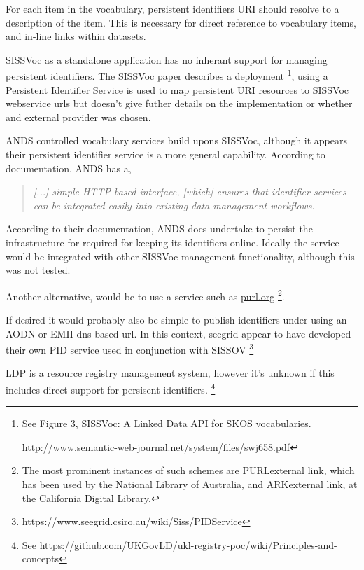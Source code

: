 \documentclass[10pt,a4paper]{article}
\newenvironment{italicquotes}
{\begin{quote}\itshape}
{\end{quote}}
\begin{document}
\begin{flushleft}
  For each item in the vocabulary, persistent identifiers {URI} should
  resolve to a description of the item.  This is necessary for direct reference to
  vocabulary items, and in-line links within datasets.

  \item[SISSVoc] as a standalone application has no inherant support for managing persistent
  identifiers. The SISSVoc paper describes a deployment \footnote{ See Figure 3,
  SISSVoc: A Linked Data API for SKOS vocabularies.

  \url{http://www.semantic-web-journal.net/system/files/swj658.pdf} }, using a
  Persistent Identifier Service is used to map persistent URI resources to SISSVoc
  webservice urls but doesn't give futher details on the implementation or
  whether and external provider was chosen. 

  \item[ANDS] controlled vocabulary services build upons SISSVoc, although it appears
  their persistent identifier service is a more general capability. According to
  documentation, ANDS has a, 

  \begin{italicquotes} [...] simple HTTP-based interface, [which] ensures that
  identifier services can be integrated easily into existing data management
  workflows.  \end{italicquotes}
  According to their documentation, ANDS does undertake to persist the infrastructure for required for
  keeping its identifiers online. Ideally the service would be integrated
  with other SISSVoc management functionality, although this was not tested.

  \item[]Another alternative, would be to use a service such as \url{purl.org}  \footnote{ The most
  prominent instances of such schemes are PURLexternal link, which has been used
  by the National Library of Australia, and ARKexternal link, at the California
  Digital Library.  }. 

  \item[]If desired it would probably also be simple to publish identifiers under using an
  AODN or EMII dns based url. In this context, seegrid appear to have developed their own
  PID service used in conjunction with SISSOV  \footnote{
  https://www.seegrid.csiro.au/wiki/Siss/PIDService}  
  
  \item[]LDP is a resource registry management system, however it's unknown 
  if this includes direct support for persisent identifiers.
    \footnote{ See 
    https://github.com/UKGovLD/ukl-registry-poc/wiki/Principles-and-concepts
  }



\end{flushleft}
\end{document}
